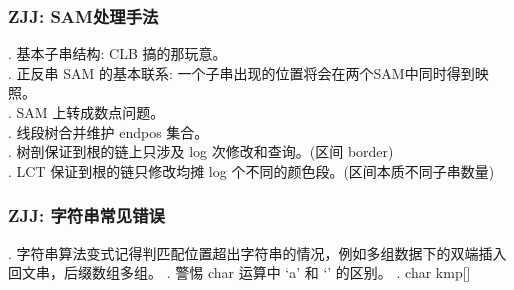 \subsubsection*{ZJJ: SAM处理手法}
. 基本子串结构: CLB 搞的那玩意。\\	
. 正反串 SAM 的基本联系: 一个子串出现的位置将会在两个SAM中同时得到映照。\\	
. SAM 上转成数点问题。\\	
. 线段树合并维护 endpos 集合。\\	
. 树剖保证到根的链上只涉及 log 次修改和查询。(区间 border) \\	
. LCT 保证到根的链只修改均摊 log 个不同的颜色段。(区间本质不同子串数量)

\subsubsection*{ZJJ: 字符串常见错误}
. 字符串算法变式记得判匹配位置超出字符串的情况，例如多组数据下的双端插入回文串，后缀数组多组。
. 警惕 char 运算中 `a' 和 `' 的区别。
. char kmp[]